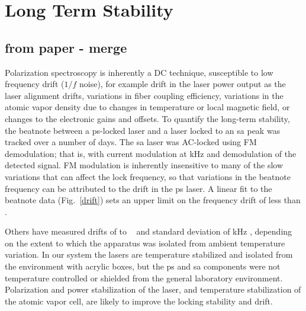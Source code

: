 \section{Long Term Stability}
\subsection{from paper - merge}
Polarization spectroscopy is inherently a DC technique, susceptible to low frequency drift ($1/f$ noise), for example drift in the laser power output as the laser alignment drifts, variations in fiber coupling efficiency, variations in the atomic vapor density due to changes in temperature or local magnetic field, or changes to the electronic gains and offsets.
To quantify the long-term stability, the beatnote between a \gls*{ps}-locked laser and a laser locked to an \gls*{sa} peak was tracked over a number of days.
The \gls*{sa} laser was AC-locked using FM demodulation; that is, with current modulation at \unit[250]{kHz} and demodulation of the detected signal.
FM modulation is inherently insensitive to many of the slow variations that can affect the lock frequency, so that variations in the beatnote frequency can be attributed to the drift in the \gls*{ps} laser.
A linear fit to the beatnote data (Fig.~\ref{drift}) sets an upper limit on the frequency drift of less than . 

Others have measured drifts of  to ~\cite{yoshikawa_frequency_2003, tiwari_laser_2006} and standard deviation of \unit[400]{kHz} \cite{lee_frequency_2014}, depending on the extent to which the apparatus was isolated from ambient temperature variation.
In our system the lasers are temperature stabilized and isolated from the environment with acrylic boxes, but the \gls*{ps} and \gls*{sa} components were not temperature controlled or shielded from the general laboratory environment.
Polarization and power stabilization of the laser, and temperature stabilization of the atomic vapor cell, are likely to improve the locking stability and drift.

